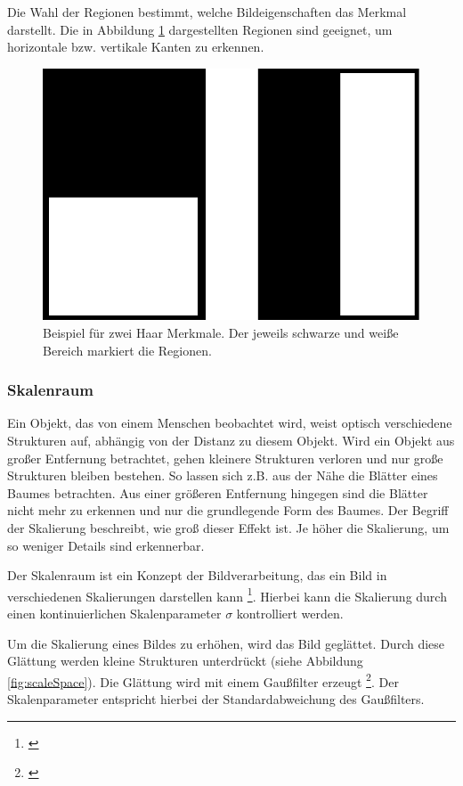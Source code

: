 Die Wahl der Regionen bestimmt, welche Bildeigenschaften das Merkmal darstellt. Die in Abbildung \ref{fig:haar} dargestellten Regionen sind geeignet, um horizontale bzw. vertikale Kanten zu erkennen.


\begin{figure}[h]
    \centering
		\includegraphics[scale=0.25]{bilder/haar.png}
    	\caption{Beispiel für zwei Haar Merkmale. Der jeweils schwarze und weiße Bereich markiert die Regionen. }
    	\label{fig:haar}
\end{figure}


\subsubsection{Skalenraum}

Ein Objekt, das von einem Menschen beobachtet wird, weist optisch verschiedene Strukturen auf, abhängig von der Distanz zu diesem Objekt. Wird ein Objekt aus großer Entfernung betrachtet, gehen kleinere Strukturen verloren und nur große Strukturen bleiben bestehen.
So lassen sich z.B. aus der Nähe die Blätter eines Baumes betrachten. Aus einer größeren Entfernung hingegen sind die Blätter nicht mehr zu erkennen und nur die grundlegende Form des Baumes.
Der Begriff der Skalierung beschreibt, wie groß dieser Effekt ist. Je höher die Skalierung, um so weniger Details sind erkennerbar.

Der Skalenraum ist ein Konzept der Bildverarbeitung, das ein Bild in verschiedenen Skalierungen darstellen kann \footnote{\cite{Lindeberg94scale-spacetheory:}}. Hierbei kann die Skalierung durch einen kontinuierlichen Skalenparameter $\sigma$ kontrolliert werden.

Um die Skalierung eines Bildes zu erhöhen, wird das Bild geglättet. Durch diese Glättung werden kleine Strukturen unterdrückt (siehe Abbildung \ref{fig:scaleSpace}). Die Glättung wird mit einem Gaußfilter erzeugt \footnote{\cite{Lindeberg94scale-spacetheory:}}. Der Skalenparameter entspricht hierbei der Standardabweichung des Gaußfilters.

